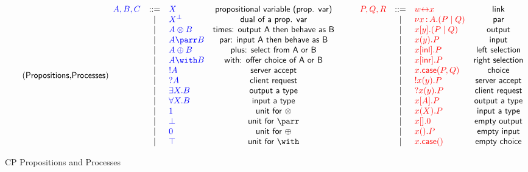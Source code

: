 \begin{figure*}
\begin{gather*}
\colored
  \tag{\key{Propositions},\key{Processes}}
  \begin{array}{rclc}
    \tp{A,B,C} & \bnf & \tp{X} & \key{propositional variable (prop. var)}\\
          & \alt & \tp{\dualbt{X}} & \key{dual of a prop. var}\\
          & \alt & \tp{A \otimes B} & \key{times: output A then behave as B}\\
          & \alt & \tp{A \parr B} & \key{par: input A then behave as B}\\
          & \alt & \tp{A \oplus B} & \key{plus: select from A or B}\\
          & \alt & \tp{A \with B} & \key{with: offer choice of A or B}\\
          & \alt & \tp{! A} & \key{server accept}\\
          & \alt & \tp{? A} & \key{client request}\\
          & \alt & \tp{\exists X . B} & \key{output a type}\\
          & \alt & \tp{\forall X . B} & \key{input a type}\\
          & \alt & \tp{1} & \key{unit for $\otimes$}\\
          & \alt & \tp{\bot} & \key{unit for $\parr$}\\
          & \alt & \tp{0} & \key{unit for $\oplus$}\\
          & \alt & \tp{\top} & \key{unit for $\with$}
  \end{array}
  \qquad
  \begin{array}{rclc}
    \tm{P,Q,R} & \bnf & \tm{w \link x} & \key{link}\\
          & \alt & \tm{\nu x \of{A}.(P \mid Q)} & \key{par}\\
          & \alt & \tm{x[y].(P \mid Q)} & \key{output}\\
          & \alt & \tm{x(y).P} & \key{input}\\
          & \alt & \tm{x[\inlterm].P} & \key{left selection}\\
          & \alt & \tm{x[\inrterm].P} & \key{right selection}\\
          & \alt & \tm{x.\caseterm(P,Q)} & \key{choice}\\
          & \alt & \tm{!x(y).P} & \key{server accept}\\
          & \alt & \tm{?x(y).P} & \key{client request}\\
          & \alt & \tm{x[A].P} & \key{output a type}\\
          & \alt & \tm{x(X).P} & \key{input a type}\\
          & \alt & \tm{x[].0} & \key{empty output}\\
          & \alt & \tm{x().P} & \key{empty input}\\
          & \alt & \tm{x.\caseterm()} & \key{empty choice}
  \end{array}
\end{gather*}
\caption{CP Propositions and Processes}
\label{fig:cptnts}
\end{figure*}
